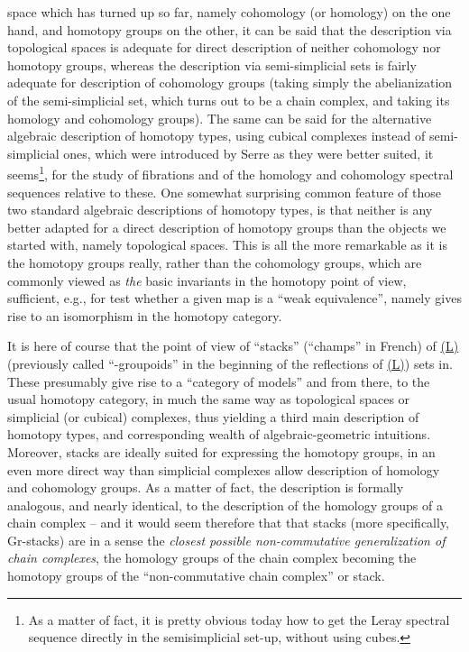 space which has turned up so far, namely cohomology (or homology) on
the one hand, and homotopy groups on the other, it can be said that
the description via topological spaces is adequate for direct
description of neither cohomology nor homotopy groups, whereas the
description via semi-simplicial sets is fairly adequate for
description of cohomology groups (taking simply the abelianization of
the semi-simplicial set, which turns out to be a chain complex, and
taking its homology and cohomology groups). The same can be said for
the alternative algebraic description of homotopy types, using cubical
complexes instead of semi-simplicial ones, which were introduced by
Serre as they were better suited, it seems\footnote{As a matter of fact, it is pretty obvious today how to get the Leray spectral sequence directly in the semisimplicial set-up, without using cubes.}, for the study of
fibrations and of the homology and cohomology spectral sequences
relative to these. One somewhat surprising common feature of those two
standard algebraic descriptions of homotopy types, is that neither is
any better adapted for a direct description of homotopy groups than
the objects we started with, namely topological spaces. This is all
the more remarkable as it is the homotopy groups really, rather than
the cohomology groups, which are commonly viewed as \emph{the} basic
invariants in the homotopy point of view, sufficient, e.g., for test
whether a given map is a ``weak equivalence'', namely gives rise to an
isomorphism in the homotopy category. 

It is here of course that the
point of view of ``stacks'' (``champs'' in French) of
\hyperref[ch:I]{(L)} (previously called ``\oo-groupoids'' in the
beginning of the reflections of \hyperref[ch:I]{(L)}) sets in. These
presumably give rise to a ``category of models'' and from there, to the usual homotopy category, in much the same way as topological spaces or simplicial (or cubical)
complexes, thus yielding a third main description of
homotopy types, and corresponding wealth of algebraic-geometric
intuitions. Moreover, stacks are ideally suited for expressing the
homotopy groups, in an even more direct way than simplicial
complexes allow description of homology and cohomology
groups. As a matter of fact, the description is formally analogous,
and nearly identical, to the description of the homology groups of a
chain complex -- and it would seem therefore that that stacks (more
specifically, Gr-stacks) are in a sense the \emph{closest possible
non-commutative generalization of chain complexes}, the homology groups
of the chain complex becoming the homotopy groups of the
``non-commutative chain complex'' or stack.


